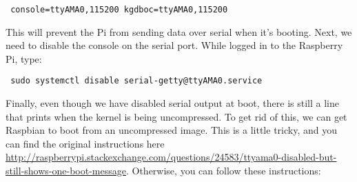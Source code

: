 \documentclass[10pt]{article}
\begin{document}
\begin{verbatim}
 console=ttyAMA0,115200 kgdboc=ttyAMA0,115200
\end{verbatim}

This will prevent the Pi from sending data over serial when it's booting. Next, we need to disable the console on the serial port. While logged in to the Raspberry Pi,
type:

\begin{verbatim}
 sudo systemctl disable serial-getty@ttyAMA0.service
\end{verbatim}

Finally, even though we have disabled serial output at boot, there is still a line that prints when the kernel is being uncompressed. To get rid of this, we can 
get Raspbian to boot from an uncompressed image. This is a little tricky, and you can find the original instructions here 
\url{http://raspberrypi.stackexchange.com/questions/24583/ttyama0-disabled-but-still-shows-one-boot-message}. Otherwise, you can follow these instructions:
\end{document}
